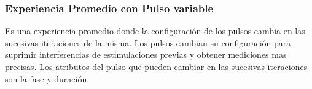 \subsubsection{Experiencia Promedio con Pulso variable}
Es una experiencia promedio donde la configuraci\'on de los pulsos cambia en las sucesivas iteraciones de la misma.
Los pulsos cambian su configuraci\'on para suprimir interferencias de estimulaciones previas y obtener mediciones
mas precisas. Los atributos del pulso que pueden cambiar en las sucesivas iteraciones son la fase y duraci\'on. 

\newpage